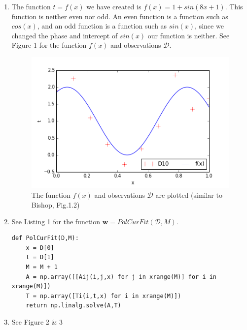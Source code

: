 \documentclass[a4paper,11pt]{article}
\theoremstyle{mytheor}
\begin{document}
\begin{enumerate}
\item The function $t = f(x)$ we have created is $f(x) = 1 + sin(8x+1)$. This function is neither even nor odd. An even function is a function such as $cos(x)$, and an odd function is a function such as $sin(x)$, since we changed the phase and intercept of $sin(x)$ our function is neither. See Figure 1 for the function $f(x)$ and observations $\mathcal{D}$. \vspace{-0.5cm}\begin{figure}[h]
\centering
\includegraphics[scale=0.8]{1_1.png}\vspace{-0.5cm}
\caption{\vspace{-0.2cm}The function $f(x)$ and observations $\mathcal{D}$ are plotted (similar to Bishop, Fig.1.2)}
\end{figure}
\item See Listing 1 for the function $\boldsymbol{w} = PolCurFit(\mathcal{D},M)$.\vspace{-0.5cm}
\begin{lstlisting}[label={list:first},caption=Python code for function PolCurFit -- Input are the observations $\mathcal{D}$ and the results $t$ of function $f(x)$ and the order of the polynomial $M$. The functions calculates the $A$-matrix and $T$-vector and solves this equation to find the weights.]
def PolCurFit(D,M):
    x = D[0]
    t = D[1]
    M = M + 1
    A = np.array([[Aij(i,j,x) for j in xrange(M)] for i in xrange(M)])
    T = np.array([Ti(i,t,x) for i in xrange(M)])
    return np.linalg.solve(A,T)
\end{lstlisting}
\item See Figure 2 \& 3 \vspace{-0.5cm}\begin{figure}[h]
\centering

\end{figure}
\end{enumerate}
\end{document}
